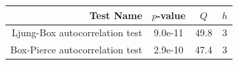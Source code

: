 \begin{tabularx}{\linewidth}{rccc}
\toprule  Test Name & $p$-value & $Q$ & $h$\\\midrule
  Ljung-Box autocorrelation test & 9.0e-11 & 49.8 & 3\\\addlinespace
  Box-Pierce autocorrelation test & 2.9e-10 & 47.4 & 3\\\bottomrule
\end{tabularx}
